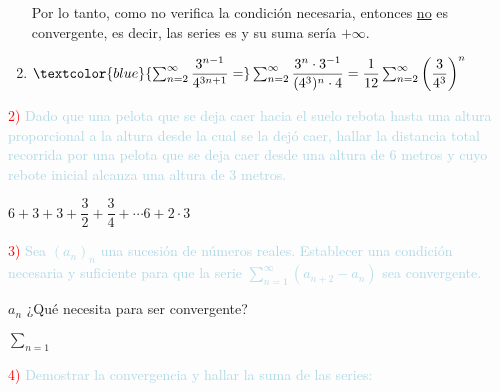 \begin{enumerate}[label=\color{red}\alph*)]
   Por lo tanto, como no verifica la condición necesaria, entonces \underline{no} es convergente, es decir, las series es  y su suma sería $+\infty$.
	
	\item $\textcolor{blue}{\sum_{n=2}^{\infty}\dfrac{3^{n-1}}{4^{3n+1}}=}\sum_{n=2}^{\infty}\dfrac{3^n\cdot3^{-1}}{(4^3)^n\cdot4}=\dfrac{1}{12}\sum_{n=2}^{\infty}\left(\dfrac{3}{4^3}\right)^n$
	
	
\end{enumerate}

\textcolor{red}{2) }\textcolor{lightblue}{Dado que una pelota que se deja caer hacia el suelo rebota hasta una altura proporcional a la altura desde la cual se la dejó caer, hallar la distancia total recorrida por una pelota que se deja caer desde una altura de 6 metros y cuyo rebote inicial alcanza una altura de 3 metros.}

$6+3+3+\dfrac{3}{2}+\dfrac{3}{4}+\cdots6+2\cdot 3$

\textcolor{red}{3) }\textcolor{lightblue}{Sea $(a_n)_n$ una sucesión de números reales. Establecer una condición necesaria y suficiente para que la serie $\sum_{n=1}^{\infty}(a_{n+2}-a_n)$ sea convergente.}

$a_n$ ¿Qué necesita para ser convergente?

$\sum_{n=1}^{}$

\textcolor{red}{4)} \textcolor{lightblue}{Demostrar la convergencia y hallar la suma de las series:}

